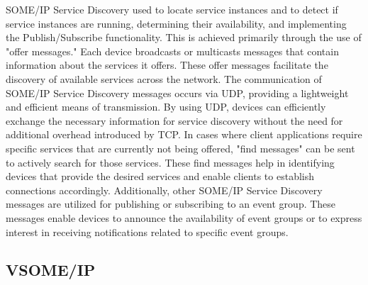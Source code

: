 \documentclass[
12pt,
oneside, 
onehalfspacing, 
nolistspacing, 
parskip, 
chapterinoneline, 
]{AASTCOMPUTER}
\begin{document}
SOME/IP Service Discovery used to locate service instances and to detect if service instances are running, determining their availability, and implementing the Publish/Subscribe functionality. This is achieved primarily through the use of "offer messages." Each device broadcasts or multicasts messages that contain information about the services it offers. These offer messages facilitate the discovery of available services across the network.
The communication of SOME/IP Service Discovery messages occurs via UDP, providing a lightweight and efficient means of transmission. By using UDP, devices can efficiently exchange the necessary information for service discovery without the need for additional overhead introduced by TCP. In cases where client applications require specific services that are currently not being offered, "find messages" can be sent to actively search for those services. These find messages help in identifying devices that provide the desired services and enable clients to establish connections accordingly.
Additionally, other SOME/IP Service Discovery messages are utilized for publishing or subscribing to an event group. These messages enable devices to announce the availability of event groups or to express interest in receiving notifications related to specific event groups.
\subsection{VSOME/IP}
\end{document}
